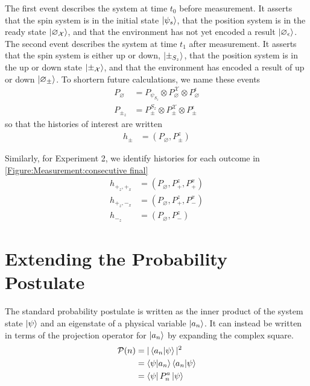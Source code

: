 The first event describes the system at time $t_0$ before measurement. It asserts that the spin system is in the initial state $\ket{\psi_s}$, that the position system is in the ready state ${\ket{\varnothing_\mathcal{X}}}$, and that the environment has not yet encoded a result $\ket{\varnothing_\epsilon}$. The second event describes the system at time $t_1$ after measurement. It asserts that the spin system is either up or down, $\ket{\pm_{S_z}}$, that the position system is in the up or down state ${\ket{\pm_\mathcal{X}}}$, and that the environment has encoded a result of up or down $\ket{\varnothing_\pm}$.  To shortern future calculations, we name these events
\begin{align}
  P_\varnothing &= P_{\psi_{S_z}} \otimes P^\mathcal{X}_\varnothing \otimes P^\epsilon_\varnothing  \\ \nonumber
  P_{\pm_z} &= P^{S_z}_\pm \otimes P^\mathcal{X}_\pm \otimes P^\epsilon_\pm
\end{align}
so that the histories of interest are written
\begin{align}
  h_\pm &= \left(P_\varnothing, P^z_{\pm} \right)
\end{align}

Similarly, for Experiment 2, we identify histories for each outcome in \autoref{Figure:Measurement:consecutive final}
\begin{align} \label{eq:Experiment 2 Histories}
  h_{+_z, +_x} &= \left(P_\varnothing, P^z_+, P^x_+ \right) \\ \nonumber
  h_{+_z, -_x} &= \left(P_\varnothing, P^z_+, P^x_- \right) \\ \nonumber
  h_{-_z} &= \left(P_\varnothing, P^z_-\right)
\end{align}

\section{Extending the Probability Postulate}

The standard probability postulate is written as the inner product of the system state $\ket{\psi}$ and an eigenstate of a physical variable $\ket{a_n}$. It can instead be written in terms of the projection operator for $\ket{a_n}$ by expanding the complex square.
\begin{align}
        \mathcal{P}(n) &= |\braket{a_n|\psi}|^2 \\ \nonumber
        &= \braket{\psi|a_n} \braket{a_n|\psi} \\ \nonumber
        &= \bra{\psi} P^a_n \ket{\psi}
\end{align}

